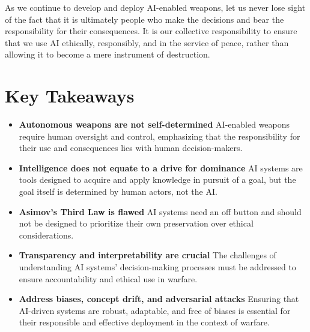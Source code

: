 As we continue to develop and deploy AI-enabled weapons, let us never lose sight of the fact that it is ultimately people who make the decisions and bear the responsibility for their consequences. It is our collective responsibility to ensure that we use AI ethically, responsibly, and in the service of peace, rather than allowing it to become a mere instrument of destruction.

\section{Key Takeaways}

\begin{itemize}
\item \textbf{Autonomous weapons are not self-determined} AI-enabled weapons require human oversight and control, emphasizing that the responsibility for their use and consequences lies with human decision-makers.
\item \textbf{Intelligence does not equate to a drive for dominance} AI systems are tools designed to acquire and apply knowledge in pursuit of a goal, but the goal itself is determined by human actors, not the AI.
\item \textbf{Asimov's Third Law is flawed} AI systems need an off button and should not be designed to prioritize their own preservation over ethical considerations.
\item \textbf{Transparency and interpretability are crucial} The challenges of understanding AI systems' decision-making processes must be addressed to ensure accountability and ethical use in warfare.
\item \textbf{Address biases, concept drift, and adversarial attacks} Ensuring that AI-driven systems are robust, adaptable, and free of biases is essential for their responsible and effective deployment in the context of warfare.
\end{itemize}
